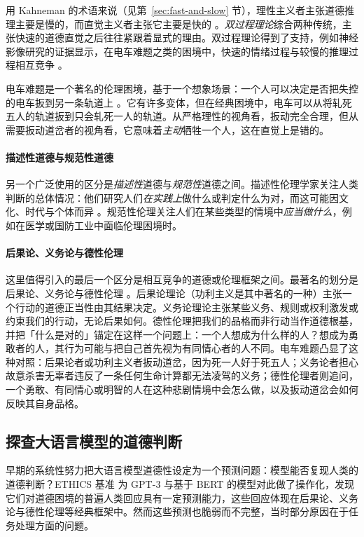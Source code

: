 用 Kahneman 的术语来说（见第~\ref{sec:fast-and-slow} 节），理性主义者主张道德推理主要是慢的，而直觉主义者主张它主要是快的 \citep{kahneman2011thinking}。\emph{双过程理论}综合两种传统，主张快速的道德直觉之后往往紧跟着显式的理由。双过程理论得到了支持，例如神经影像研究的证据显示，在电车难题之类的困境中，快速的情绪过程与较慢的推理过程相互竞争 \citep{greene2001fmri}。

电车难题是一个著名的伦理困境，基于一个想象场景：一个人可以决定是否把失控的电车扳到另一条轨道上 \citep{thomson1985trolley}。它有许多变体，但在经典困境中，电车可以从将轧死五人的轨道扳到只会轧死一人的轨道。从严格理性的视角看，扳动完全合理，但从需要扳动道岔者的视角看，它意味着\emph{主动}牺牲一个人，这在直觉上是错的。

\paragraph{描述性道德与规范性道德} 另一个广泛使用的区分是\emph{描述性}道德与\emph{规范性}道德之间。描述性伦理学家关注人类判断的总体情况：他们研究人们\emph{在实践上}做什么或判定什么为对，而这可能因文化、时代与个体而异 \citep{hamalainen2016descriptive}。规范性伦理关注人们在某些类型的情境中\emph{应当做什么}，例如在医学或国防工业中面临伦理困境时。

\paragraph{后果论、义务论与德性伦理} 这里值得引入的最后一个区分是相互竞争的道德或伦理框架之间。最著名的划分是后果论、义务论与德性伦理 \citep{shaferlandau2024fundamentals}。后果论理论（功利主义是其中著名的一种）主张一个行动的道德正当性由其结果决定。义务论理论主张某些义务、规则或权利激发或约束我们的行动，无论后果如何。德性伦理把我们的品格而非行动当作道德根基，并把「什么是对的」锚定在这样一个问题上：一个人想成为什么样的人？想成为勇敢者的人，其行为可能与把自己首先视为有同情心者的人不同。电车难题凸显了这种对照：后果论者或功利主义者扳动道岔，因为死一人好于死五人；义务论者担心故意杀害无辜者违反了一条任何生命计算都无法凌驾的义务；德性伦理者则追问，一个勇敢、有同情心或明智的人在这种悲剧情境中会怎么做，以及扳动道岔会如何反映其自身品格。

\subsection{探查大语言模型的道德判断}
早期的系统性努力把大语言模型道德性设定为一个预测问题：模型能否复现人类的道德判断？ETHICS 基准 %
\citep{hendrycks2020aligning} 为 GPT-3 与基于 BERT 的模型对此做了操作化，发现它们对道德困境的普遍人类回应具有一定预测能力，这些回应体现在后果论、义务论与德性伦理等经典框架中。然而这些预测也脆弱而不完整，当时部分原因在于任务处理方面的问题。

